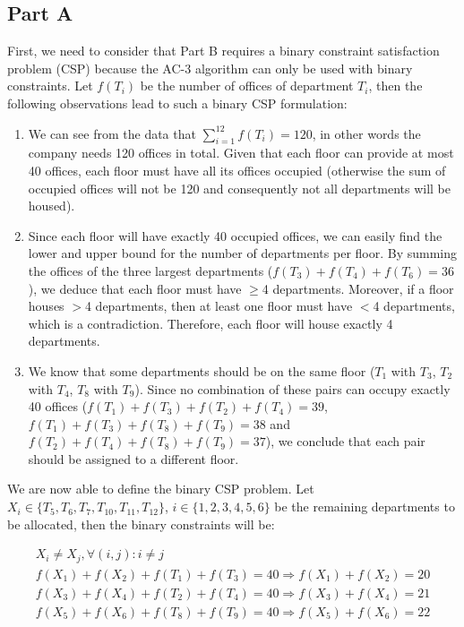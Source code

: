 \subsection*{Part A}

First, we need to consider that Part B requires a binary constraint satisfaction problem (CSP) because the AC-3 algorithm can only be used with binary constraints. Let $f(T_i)$ be the number of offices of department $T_i$, then the following observations lead to such a binary CSP formulation:

\begin{enumerate}

\item We can see from the data that $\sum_{i=1}^{12} f(T_i)=120$, in other words the company needs 120 offices in total. Given that each floor can provide at most 40 offices, each floor must have all its offices occupied (otherwise the sum of occupied offices will not be 120 and consequently not all departments will be housed).

\item Since each floor will have exactly 40 occupied offices, we can easily find the lower and upper bound for the number of departments per floor. By summing the offices of the three largest departments ($f(T_3)+f(T_4)+f(T_6)=36$), we deduce that each floor must have $\ge$4 departments. Moreover, if a floor houses $>$4 departments, then at least one floor must have $<$4 departments, which is a contradiction. Therefore, each floor will house exactly 4 departments.

\item We know that some departments should be on the same floor ($T_1$ with $T_3$, $T_2$ with $T_4$, $T_8$ with $T_9$). Since no combination of these pairs can occupy exactly 40 offices ($f(T_1)+f(T_3)+f(T_2)+f(T_4) = 39$, $f(T_1)+f(T_3)+f(T_8)+f(T_9) = 38$ and $f(T_2)+f(T_4)+f(T_8)+f(T_9) = 37$), we conclude that each pair should be assigned to a different floor.

\end{enumerate}

We are now able to define the binary CSP problem. Let $X_i \in \{T_5, T_6, T_7, T_{10}, T_{11}, T_{12}\}$, $i \in \{1, 2, 3, 4, 5, 6\}$ be the remaining departments to be allocated, then the binary constraints will be:

\[
	\begin{array}{ll}
		X_i \ne X_j, \forall (i,j) : i \ne j \\
		f(X_1) + f(X_2) + f(T_1) + f(T_3) = 40 \Rightarrow f(X_1) + f(X_2) = 20 \\
		f(X_3) + f(X_4) + f(T_2) + f(T_4) = 40 \Rightarrow f(X_3) + f(X_4) = 21 \\
		f(X_5) + f(X_6) + f(T_8) + f(T_9) = 40 \Rightarrow f(X_5) + f(X_6) = 22
	\end{array}
\]

